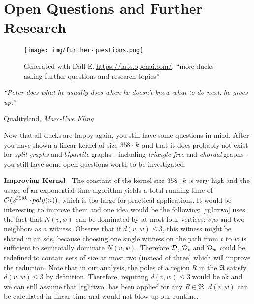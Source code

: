 \chapter{Open Questions and Further Research}\label{ch:closing}

\vspace*{-50pt}

\begin{figure}[ht]
        \texttt{[image: img/further-questions.png]}
        \captionsetup{textformat=empty,labelformat=blank}
        \caption[Generated with Dalle-E. Knowledge Cutoff 09-2022]{Generated with Dall-E. \url{https://labs.openai.com/}. ``more ducks asking further questions and research topics''}
\end{figure}

\epigraph{\itshape ``Peter does what he usually does when he doesn’t know what to do next: he gives up.''}{Qualityland, \textit{Marc-Uwe Kling}}

Now that all ducks are happy again, you still have some questions in mind.
After you have shown a linear kernel of size $358 \cdot k$ and that it does probably not exist for \textit{split graphs} and \textit{bipartite} graphs - including \textit{triangle-free} and \textit{chordal} graphs - you still have some open questions worth to be investigated.


\noindent \textbf{Improving Kernel~}
The constant of the kernel size $358 \cdot k$ is very high and the usage of an exponential time algorithm yields a total running time of  $\mathcal{O}(2^{358 k} \cdot poly(n))$, which is too large for practical applications.
It would be interesting to improve them and one idea would be the following:
\cref{rgl:rtwo} uses the fact that $N(v,w)$ can be dominated by at most four vertices: $v$,$w$ and two neighbors as a witness.
Observe that if $d(v,w) \leq 3$, this witness might be shared in an sds, because choosing one single witness on the path from $v$ to $w$ is sufficient to semitotally dominate $N(v,w)$.
Therefore $\mathcal{D}$, $\mathcal{D}_{v}$ and $\mathcal{D}_{w}$ could be redefined to contain sets of size at most two (instead of three) which will improve the reduction. 
Note that in our analysis, the poles of a region $R$ in the \dreg $\mathfrak{R}$ satisfy $d(v,w) \leq 3$ by definition.
Therefore, requiring $d(v,w) \leq 3$ would be ok and we can still assume that \cref{rgl:rtwo} has been applied for any $R \in \mathfrak{R}$.
$d(v,w)$ can be calculated in linear time and would not blow up our runtime.

